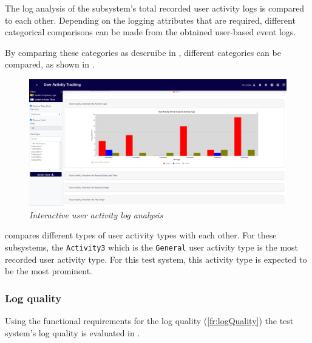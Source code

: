 The log analysis of  the subsystem's total recorded user activity logs is compared to each other. Depending on the logging attributes that are required, different categorical comparisons can be made from the obtained user-based event logs. \par By comparing these categories as descruibe in , different categories can be compared, as shown in . 

\begin{figure}[!htb]
	\centering %
	\includegraphics[width=0.99\linewidth]{img/ch3/analysis/UAT_menu_activities.png}
	\caption[Interactive user activity log analysis]
	{\textit{Interactive user activity log analysis}}\label{fig:ch3_UAT_menuActivities}
\end{figure}

 compares different types of user activity types with each other. For these subsystems, the \texttt{Activity3} which is the \texttt{General} user activity type is the most recorded user activity type. For this test system, this activity type is expected to be the most prominent.  

\subsubsection{Log quality}
Using the functional requirements for the log quality (\ref{fr:logQuality}) the test system's log quality is evaluated in .


